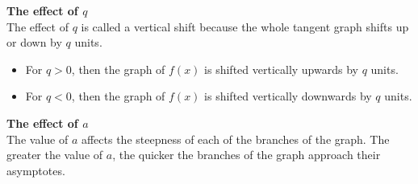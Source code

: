 \textbf{The effect of $q$}
\\
The effect of $q$ is called a vertical shift because the whole tangent graph shifts up or down by $q$ units. 
\begin{itemize}
\item For $q>0$, then the graph of $f(x)$ is shifted vertically upwards by $q$ units. 
\item For $q<0$, then the graph of $f(x)$ is shifted vertically downwards by $q$ units. 
\end{itemize}

\textbf{The effect of $a$}
\\
The value of $a$ affects the steepness of each of the branches of the graph. The greater the value of $a$, the quicker the branches of the graph approach their asymptotes.


